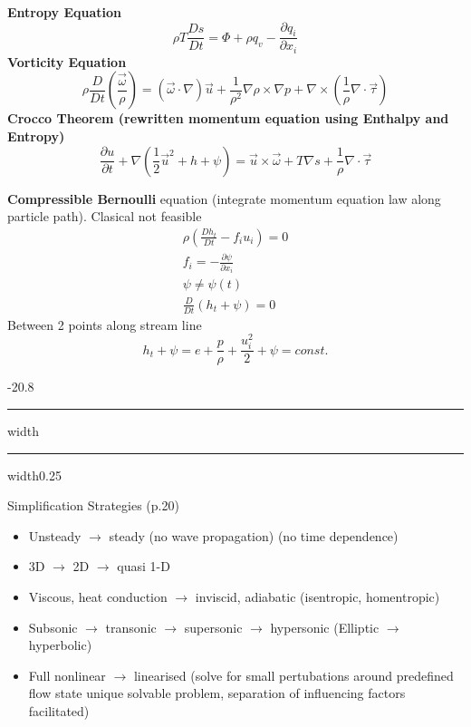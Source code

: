 \documentclass[8pt, landscape, fleqn]{scrartcl}
\makeatletter
\renewcommand{\section}{\@startsection{section}{1}{0mm}%
{-2\baselineskip}{0.8\baselineskip}%
{\hrule depth 0.2pt width\columnwidth\hrule depth1.5pt
width0.25\columnwidth\vspace*{1.2em}\Large\bfseries\rmfamily}}
\makeatother
\begin{document}
\begin{multicols*}{3}
\textbf{Entropy Equation}
\begin{equation*}
    \rho T \frac{Ds}{Dt} = \Phi + \rho q_v - \frac{\partial q_i}{\partial x_i}
\end{equation*}
\textbf{Vorticity Equation}
\begin{equation*}
    \rho \frac{D}{Dt} \left( \frac{\vec{\omega}}{\rho} \right) = \left( \vec{\omega} \cdot \nabla \right) \vec{u} + \frac{1}{\rho^2} \nabla \rho \times \nabla p + \nabla \times \left( \frac{1}{\rho} \nabla \cdot \vec{\tau}\right)
\end{equation*}
\textbf{Crocco Theorem (rewritten momentum equation using Enthalpy and Entropy)}
\begin{equation*}
    \frac{\partial u}{\partial t} + \nabla \left( \frac{1}{2} \vec{u}^2 + h + \psi \right) = \vec{u} \times \vec{\omega} + T \nabla s + \frac{1}{\rho} \nabla \cdot \vec{\tau}
\end{equation*}

\textbf{Compressible Bernoulli}
equation (integrate momentum equation law along particle path). Clasical not feasible
\begin{align*}
    \rho \left( \frac{D h_t}{D t} - f_i u_i\right) = 0 \\
    f_i = - \frac{\partial \psi}{\partial x_i} \\
    \psi \neq \psi(t) \\
    \frac{D}{Dt}\left( h_t + \psi \right) = 0
\end{align*}
Between 2 points along stream line
\begin{equation*}
    h_t + \psi = e + \frac{p}{\rho} + \frac{u_i^2}{2} + \psi = const.
\end{equation*}

\section{Simplification Strategies (p.20)}

\begin{itemize}
    \item Unsteady $\rightarrow$ steady (no wave propagation) (no time dependence)
    \item 3D $\rightarrow$ 2D $\rightarrow$ quasi 1-D
    \item Viscous, heat conduction $\rightarrow$ inviscid, adiabatic (isentropic, homentropic)
    \item Subsonic $\rightarrow$ transonic $\rightarrow$ supersonic $\rightarrow$ hypersonic (Elliptic $\rightarrow$ hyperbolic)
    \item Full nonlinear $\rightarrow$ linearised (solve for small pertubations around predefined flow state unique solvable problem, separation of influencing factors facilitated)
\end{itemize}


\end{multicols*}
\end{document}
